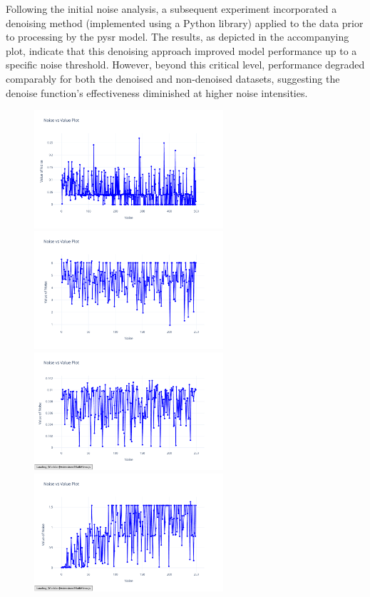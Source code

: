 \documentclass{article}
\begin{document}
    Following the initial noise analysis, a subsequent experiment incorporated a denoising method (implemented using a Python library) applied to the data prior to processing by the pysr model. The results, as depicted in the accompanying plot, indicate that this denoising approach improved model performance up to a specific noise threshold. However, beyond this critical level, performance degraded comparably for both the denoised and non-denoised datasets, suggesting the denoise function's effectiveness diminished at higher noise intensities.\cite{Wood2022} \\


\begin{figure}[H]
    \centering
    \includegraphics[width=7cm]{noise_conservation_d_r}
    \includegraphics[width=7cm]{noise_Newtons_First_Law_d_r}
    \includegraphics[width=7cm]{noise_Newtons_Second_Law_d_r}
    \includegraphics[width=7cm]{noise_Newtons_Third_Law_d_r}

\end{figure}
\end{document}

